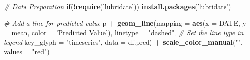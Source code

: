 \documentclass[]{book}
\newenvironment{Shaded}{\begin{snugshade}}{\end{snugshade}}
\newcommand{\KeywordTok}[1]{\textcolor[rgb]{0.13,0.29,0.53}{\textbf{#1}}}
\newcommand{\DataTypeTok}[1]{\textcolor[rgb]{0.13,0.29,0.53}{#1}}
\newcommand{\DecValTok}[1]{\textcolor[rgb]{0.00,0.00,0.81}{#1}}
\newcommand{\StringTok}[1]{\textcolor[rgb]{0.31,0.60,0.02}{#1}}
\newcommand{\CommentTok}[1]{\textcolor[rgb]{0.56,0.35,0.01}{\textit{#1}}}
\newcommand{\ControlFlowTok}[1]{\textcolor[rgb]{0.13,0.29,0.53}{\textbf{#1}}}
\newcommand{\OperatorTok}[1]{\textcolor[rgb]{0.81,0.36,0.00}{\textbf{#1}}}
\newcommand{\NormalTok}[1]{#1}
\begin{document}
\begin{Shaded}
\begin{Highlighting}[]
\CommentTok{# Data Preparation}
\ControlFlowTok{if}\NormalTok{(}\OperatorTok{!}\KeywordTok{require}\NormalTok{(}\StringTok{'lubridate'}\NormalTok{)) }\KeywordTok{install.packages}\NormalTok{(}\StringTok{'lubridate'}\NormalTok{)}
\end{Highlighting}
\end{Shaded}

\begin{Shaded}
\end{Shaded}

\begin{Shaded}
\begin{Highlighting}[]
\CommentTok{# Add a line for predicted value}
\NormalTok{p }\OperatorTok{+}\StringTok{ }\KeywordTok{geom_line}\NormalTok{(}\DataTypeTok{mapping =} \KeywordTok{aes}\NormalTok{(}\DataTypeTok{x =}\NormalTok{ DATE, }
                            \DataTypeTok{y =}\NormalTok{ mean,}
                            \DataTypeTok{color =} \StringTok{'Predicted Value'}\NormalTok{),}
              \DataTypeTok{linetype =} \StringTok{"dashed"}\NormalTok{,}
              \CommentTok{# Set the line type in legend}
              \DataTypeTok{key_glyph =} \StringTok{"timeseries"}\NormalTok{,}
              \DataTypeTok{data =}\NormalTok{ df.pred) }\OperatorTok{+}\StringTok{ }
\StringTok{  }\KeywordTok{scale_color_manual}\NormalTok{(}\StringTok{""}\NormalTok{, }\DataTypeTok{values =} \StringTok{"red"}\NormalTok{)}
\end{Highlighting}
\end{Shaded}
\end{document}
